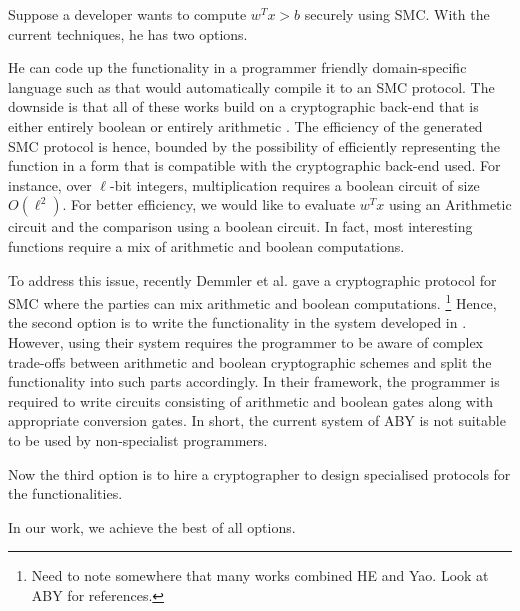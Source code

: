 Suppose a developer wants to compute $w^Tx >b$ securely using
SMC. With the current techniques, he has two options. 
\begin{tiret}
\item He can code up the functionality in a programmer friendly
  domain-specific language such as
  \cite{lambdaps,wysteria,oblivm,smcl} that would automatically
  compile it to an SMC protocol. The downside is that all of these
  works build on a cryptographic back-end that is either entirely
  boolean \cite{yao,gmw} or entirely arithmetic \cite{homo}. The efficiency of the generated SMC protocol is hence, bounded by the possibility of efficiently representing the function in a form that is compatible with the cryptographic back-end used. For instance, over $\ell$-bit integers, multiplication requires a boolean circuit of size  $O(\ell^2)$. 
For better efficiency, we would like to evaluate $w^Tx$ using an Arithmetic circuit and the comparison using a boolean circuit.
In fact, most interesting functions require a mix of arithmetic and boolean computations.
\item To address this issue, recently Demmler et al. \cite{aby} gave a cryptographic protocol for SMC where the parties can mix arithmetic and boolean computations. \footnote{Need to note somewhere that many works combined HE and Yao. Look at ABY for references.}
Hence, the second option is to write the functionality in the system developed in \cite{aby}.
However, using their system requires the programmer to be aware of
complex trade-offs between arithmetic and boolean cryptographic
schemes and split the functionality into such parts accordingly. In
their framework, the programmer is required to write circuits
consisting of  arithmetic and boolean gates along with appropriate
conversion gates. In short, the current system of ABY is not suitable
to be used by non-specialist programmers.

\item Now the third option is to hire a cryptographer to design specialised protocols for the functionalities. 
\end{tiret}
In our work, we achieve the best of all options. 



